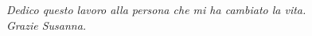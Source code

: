 
\vspace{5em}
\begin{flushright}
  {\normalsize \textit{Dedico questo lavoro alla persona che mi ha cambiato la vita.}}\\
  {\normalsize \textit{Grazie Susanna.}}\\
\end{flushright}

\clearpage{\pagestyle{empty}\cleardoublepage}
